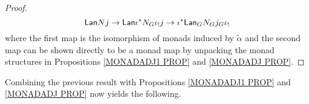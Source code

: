 \documentclass[a4paper,10pt
,draft
]{article}%
\numberwithin{equation}{section}
\numberwithin{figure}{section}
\theoremstyle{definition} %
\newcommand{\Fin}{\mathsf{F}}%
\newcommand{\1}{\ensuremath{\mathbbm 1}}%
\begin{document}
\begin{proof}
\[
	\mathsf{Lan} N j \to 
	\mathsf{Lan} \iota^{\**} N_G \iota_! j  \to
	\iota^{\**} \mathsf{Lan}_G  N_G  j_G \iota_!
\]
where the first map is the isomorphism of monads induced by $\tilde{\alpha}$ and the second map can be shown directly to be a monad map by unpacking the monad structures in 
Propositions \ref{MONADADJ1 PROP} and \ref{MONADADJ PROP}.
\end{proof}

Combining the previous result with
Propositions \ref{MONADADJ1 PROP} and \ref{MONADADJ PROP} now yields the following.
\end{document}
